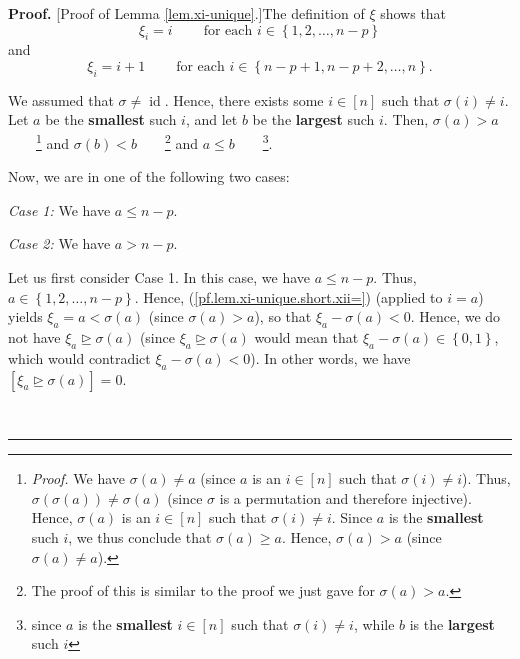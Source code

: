\documentclass
[numbers=enddot,12pt,final,onecolumn,notitlepage,english]{scrartcl}%
\theoremstyle{definition}
\newenvironment{proof}[1][Proof]{\noindent\textbf{#1.} }{\ \rule{0.5em}{0.5em}}
\newenvironment{vershort}{}{}
\begin{document}
\begin{vershort}
\begin{proof}
[Proof of Lemma \ref{lem.xi-unique}.]The definition of $\xi$ shows that%
\begin{equation}
\xi_{i}=i\ \ \ \ \ \ \ \ \ \ \text{for each }i\in\left\{  1,2,\ldots
,n-p\right\}  \label{pf.lem.xi-unique.short.xii=}%
\end{equation}
and%
\begin{equation}
\xi_{i}=i+1\ \ \ \ \ \ \ \ \ \ \text{for each }i\in\left\{  n-p+1,n-p+2,\ldots
,n\right\}  . \label{pf.lem.xi-unique.short.xin=}%
\end{equation}


We assumed that $\sigma\neq\operatorname*{id}$. Hence, there exists some
$i\in\left[  n\right]  $ such that $\sigma\left(  i\right)  \neq i$. Let $a$
be the \textbf{smallest} such $i$, and let $b$ be the \textbf{largest} such
$i$. Then, $\sigma\left(  a\right)  >a$\ \ \ \ \footnote{\textit{Proof.} We
have $\sigma\left(  a\right)  \neq a$ (since $a$ is an $i\in\left[  n\right]
$ such that $\sigma\left(  i\right)  \neq i$). Thus, $\sigma\left(
\sigma\left(  a\right)  \right)  \neq\sigma\left(  a\right)  $ (since $\sigma$
is a permutation and therefore injective). Hence, $\sigma\left(  a\right)  $
is an $i\in\left[  n\right]  $ such that $\sigma\left(  i\right)  \neq i$.
Since $a$ is the \textbf{smallest} such $i$, we thus conclude that
$\sigma\left(  a\right)  \geq a$. Hence, $\sigma\left(  a\right)  >a$ (since
$\sigma\left(  a\right)  \neq a$).} and $\sigma\left(  b\right)
<b$\ \ \ \ \footnote{The proof of this is similar to the proof we just gave
for $\sigma\left(  a\right)  >a$.} and $a\leq b$\ \ \ \ \footnote{since $a$ is
the \textbf{smallest} $i\in\left[  n\right]  $ such that $\sigma\left(
i\right)  \neq i$, while $b$ is the \textbf{largest} such $i$}.

Now, we are in one of the following two cases:

\textit{Case 1:} We have $a\leq n-p$.

\textit{Case 2:} We have $a>n-p$.

Let us first consider Case 1. In this case, we have $a\leq n-p$. Thus,
$a\in\left\{  1,2,\ldots,n-p\right\}  $. Hence,
(\ref{pf.lem.xi-unique.short.xii=}) (applied to $i=a$) yields $\xi
_{a}=a<\sigma\left(  a\right)  $ (since $\sigma\left(  a\right)  >a$), so that
$\xi_{a}-\sigma\left(  a\right)  <0$. Hence, we do not have $\xi
_{a}\trianglerighteq\sigma\left(  a\right)  $ (since $\xi_{a}\trianglerighteq
\sigma\left(  a\right)  $ would mean that $\xi_{a}-\sigma\left(  a\right)
\in\left\{  0,1\right\}  $, which would contradict $\xi_{a}-\sigma\left(
a\right)  <0$). In other words, we have $\left[  \xi_{a}\trianglerighteq
\sigma\left(  a\right)  \right]  =0$.


\end{proof}
\end{vershort}
\end{document}
